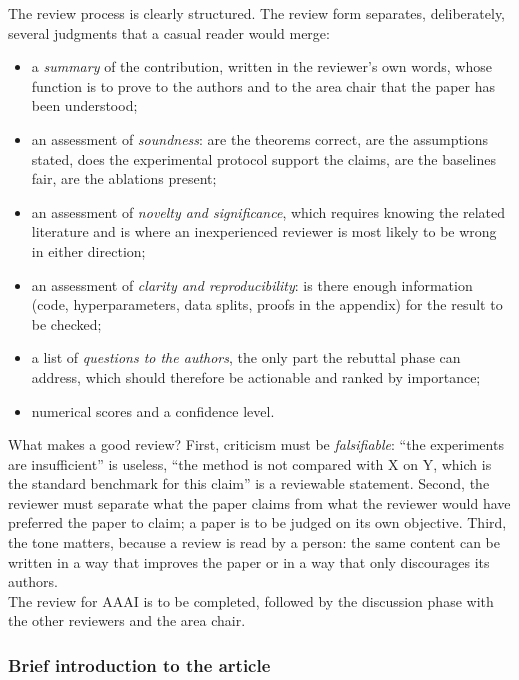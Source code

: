 \documentclass[12pt,a4paper]{article}
\theoremstyle{definition}
\theoremstyle{plain}
\begin{document}
\noindent The review process is clearly structured. The review form separates, deliberately, several
judgments that a casual reader would merge:
\begin{itemize}
\item a \emph{summary} of the contribution, written in the reviewer's own words, whose function
is to prove to the authors and to the area chair that the paper has been understood;
\item an assessment of \emph{soundness}: are the theorems correct, are the assumptions stated,
does the experimental protocol support the claims, are the baselines fair, are the ablations
present;
\item an assessment of \emph{novelty and significance}, which requires knowing the related
literature and is where an inexperienced reviewer is most likely to be wrong in either
direction;
\item an assessment of \emph{clarity and reproducibility}: is there enough information (code,
hyperparameters, data splits, proofs in the appendix) for the result to be checked;
\item a list of \emph{questions to the authors}, the only part the rebuttal phase can address,
which should therefore be actionable and ranked by importance;
\item numerical scores and a confidence level. \\
\end{itemize}

\noindent What makes a good review? First, criticism must be
\emph{falsifiable}: ``the experiments are insufficient'' is useless, ``the method is not
compared with X on Y, which is the standard benchmark for this claim'' is a reviewable
statement. Second, the reviewer must separate what the paper claims from what the reviewer
would have preferred the paper to claim; a paper is to be judged on its own objective. Third,
the tone matters, because a review is read by a person: the same content can be written in a
way that improves the paper or in a way that only discourages its authors. \\

\noindent The review for AAAI is to be completed, followed by the discussion phase with the other
reviewers and the area chair. \\

\subsubsection{Brief introduction to the article}
\label{sec:article-intro}
\end{document}
